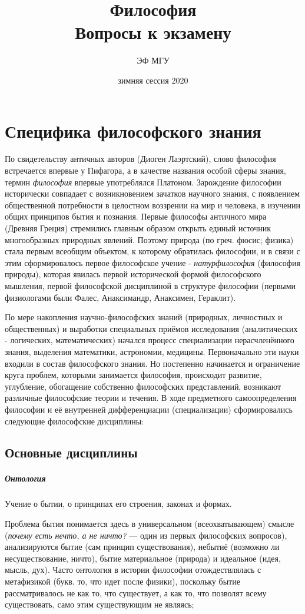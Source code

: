 \documentclass[a4paper, 12pt]{article}
\title{Философия \\ Вопросы к экзамену}
\author{ЭФ МГУ}
\date{зимняя сессия 2020}
\theoremstyle{plain} %
\theoremstyle{definition} %
\theoremstyle{remark} %
\begin{document}
\maketitle

\section{Специфика философского знания}

По свидетельству античных авторов (Диоген Лаэртский), слово философия встречается впервые у Пифагора, а в качестве названия особой сферы знания, термин \emph{философия} впервые употреблялся Платоном. Зарождение философии исторически совпадает с возникновением зачатков научного знания, с появлением общественной потребности в целостном воззрении на мир и человека, в изучении общих принципов бытия и познания. Первые философы античного мира (Древняя Греция) стремились главным образом открыть единый источник многообразных природных явлений. Поэтому природа (по греч. фюсис; физика) стала первым всеобщим объектом, к которому обратилась философии, и в связи с этим сформировалось первое философское учение - \emph{натурфилософия} (философия природы), которая явилась первой исторической формой философского мышления, первой философской дисциплиной в структуре философии (первыми физиологами были Фалес, Анаксимандр, Анаксимен, Гераклит).

\vspace{1em}
По мере накопления научно-философских знаний (природных, личностных и общественных) и выработки специальных приёмов исследования (аналитических - логических, математических) начался процесс специализации нерасчленённого знания, выделения математики, астрономии, медицины. Первоначально эти науки входили в состав философского знания. Но постепенно начинается и ограничение круга проблем, которыми занимается философия, происходит развитие, углубление, обогащение собственно философских представлений, возникают различные философские теории и течения. В ходе предметного самоопределения философии и её внутренней дифференциации (специализации) сформировались следующие философские дисциплины:
\subsection{Основные дисциплины}

\subparagraph{Онтология}
    Учение о бытии, о принципах его строения, законах и формах.

    Проблема бытия понимается здесь в универсальном (всеохватывающем) смысле (\emph{почему есть нечто, а не ничто?} --- один из первых философских вопросов), анализируются бытие (сам принцип существования), небытиё (возможно ли несуществование, ничто), бытие материальное (природа) и идеальное (идея, мысль, дух). Часто онтология в истории философии отождествлялась с метафизикой (букв. то, что идет после физики), поскольку бытие рассматривалось не как то, что существует, а как то, что позволят всему существовать, само этим существующим не являясь;
\end{document}
